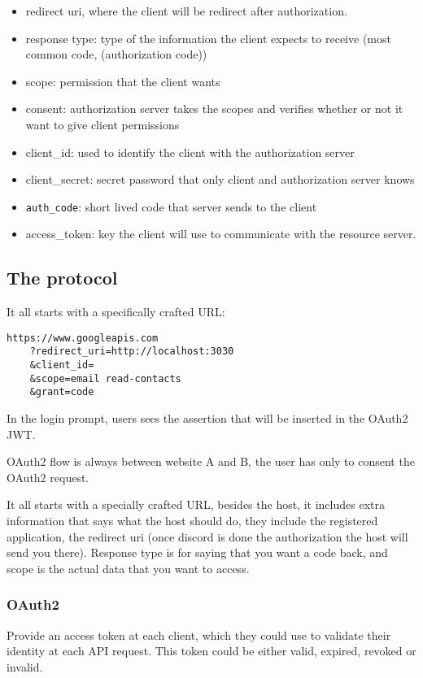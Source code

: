 \documentclass[11pt]{style}
\begin{document}
\begin{itemize}
    \item  redirect uri, where the client will be redirect after authorization.
    \item  response type: type of the information the client expects to receive
        (most common code, (authorization code))
    \item  scope: permission that the client wants
    \item  consent: authorization server takes the scopes and verifies whether or not
        it want to give client permissions
    \item  client\_id: used to identify the client with the authorization server
    \item  client\_secret: secret password that only client and authorization server knows
    \item  \texttt{auth\_code}: short lived code that server sends to the client
    \item access\_token: key the client will use to communicate with the resource server.
\end{itemize}

\subsection{The protocol}
It all starts with a specifically crafted URL:
\begin{lstlisting}
https://www.googleapis.com
    ?redirect_uri=http://localhost:3030
    &client_id=
    &scope=email read-contacts
    &grant=code
\end{lstlisting}

In the login prompt, users sees the assertion that will be inserted in the
OAuth2 JWT.

OAuth2 flow is always between website A and B, the user has only to consent the
OAuth2 request.

It all starts with a specially crafted URL, besides the host, it includes extra
information that says what the host should do, they include the registered
application, the redirect uri (once discord is done the authorization the host
will send you there). Response type is for saying that you want a code back, and
scope is the actual data that you want to access.


\subsubsection{OAuth2}
Provide an access token at each client, which they could use to validate their
identity at each API request.  This token could be either valid, expired,
revoked or invalid.
\end{document}
